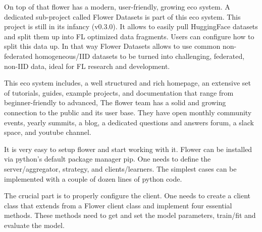 On top of that flower has a modern, user-friendly, growing eco system.
A dedicated sub-project called Flower Datasets is part of this eco system.
This project is still in its infancy (v0.3.0).
It allows to easily pull HuggingFace datasets and split them up into FL optimized data fragments.
Users can configure how to split this data up.
In that way Flower Datasets allows to use common non-federated homogeneous/IID datasets
to be turned into challenging, federated, non-IID data, ideal for FL research and development.

This eco system includes,
a well structured and rich homepage,
an extensive set of tutorials, guides, example projects, and documentation that range from beginner-friendly to advanced,
The flower team has a solid and growing connection to the public and its user base.
They have open monthly community events, yearly summits, a blog, a dedicated questions and answers forum,
a slack space, and youtube channel.

It is very easy to setup flower and start working with it.
Flower can be installed via python's default package manager pip.
One needs to define the server/aggregator, strategy, and clients/learners.
The simplest cases can be implemented with a couple of dozen lines of python code.

The crucial part is to properly configure the client.
One needs to create a client class that extends from a Flower client class
and implement four essential methods.
These methods need to get and set the model parameters,
train/fit and evaluate the model.